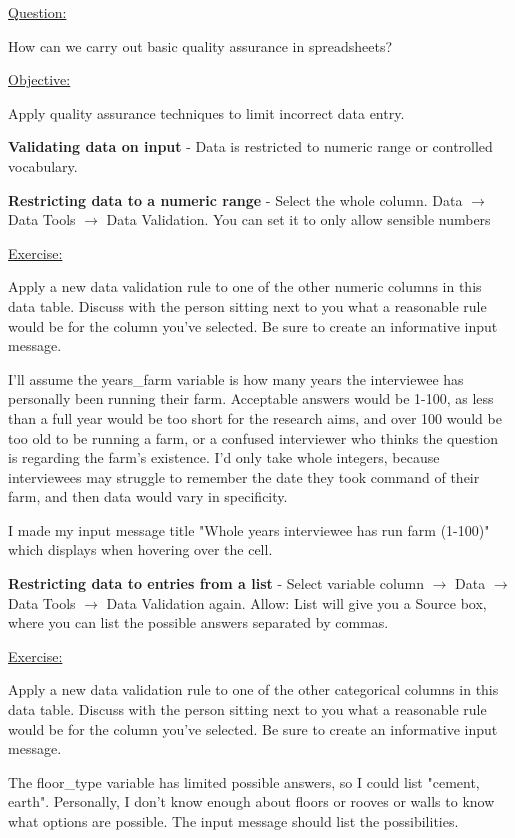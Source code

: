 \documentclass[12pt]{article}
\begin{document}
\color{gray}
\underline{Question:}

How can we carry out basic quality assurance in spreadsheets?

\underline{Objective:}

Apply quality assurance techniques to limit incorrect data entry.
\color{black}

\textbf{Validating data on input} - Data is restricted to numeric range or controlled vocabulary.

\textbf{Restricting data to a numeric range} - Select the whole column. Data $\rightarrow$ Data Tools $\rightarrow$ Data Validation. You can set it to only allow sensible numbers

\color{gray}\begin{addmargin}[1cm]{0cm}
\underline{Exercise:}

Apply a new data validation rule to one of the other numeric columns in this data table. Discuss with the person sitting next to you what a reasonable rule would be for the column you’ve selected. Be sure to create an informative input message.


\color{black}
I'll assume the years\_farm variable is how many years the interviewee has personally been running their farm. Acceptable answers would be 1-100, as less than a full year would be too short for the research aims, and over 100 would be too old to be running a farm, or a confused interviewer who thinks the question is regarding the farm's existence. I'd only take whole integers, because interviewees may struggle to remember the date they took command of their farm, and then data would vary in specificity.

I made my input message title "Whole years interviewee has run farm (1-100)" which displays when hovering over the cell.
\end{addmargin}

\color{black}
\textbf{Restricting data to entries from a list} - Select variable column $\rightarrow$ Data $\rightarrow$ Data Tools $\rightarrow$ Data Validation again. Allow: List will give you a Source box, where you can list the possible answers separated by commas.

\color{gray}\begin{addmargin}[1cm]{0cm}
\underline{Exercise:}

Apply a new data validation rule to one of the other categorical columns in this data table. Discuss with the person sitting next to you what a reasonable rule would be for the column you’ve selected. Be sure to create an informative input message.

\color{black}
The floor\_type variable has limited possible answers, so I could list "cement, earth". Personally, I don't know enough about floors or rooves or walls to know what options are possible. The input message should list the possibilities.
\end{addmargin}
\end{document}
